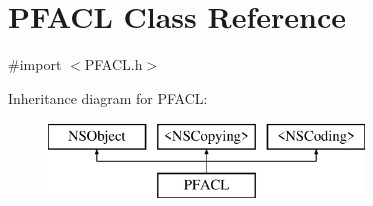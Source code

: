 \hypertarget{interface_p_f_a_c_l}{}\section{P\+F\+A\+C\+L Class Reference}
\label{interface_p_f_a_c_l}


{\ttfamily \#import $<$P\+F\+A\+C\+L.\+h$>$}

Inheritance diagram for P\+F\+A\+C\+L\+:\begin{figure}[H]
\begin{center}
\leavevmode
\includegraphics[height=2.000000cm]{interface_p_f_a_c_l}
\end{center}
\end{figure}
